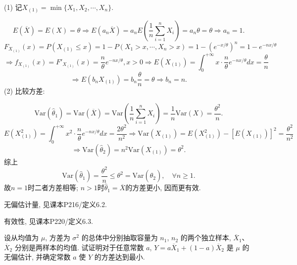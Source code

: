 \documentclass[standard]{ExBook}
\renewenvironment{shaded}{%
  \def\FrameCommand{\fboxsep=\FrameSep \colorbox{shadecolor}}%
  \MakeFramed{\advance\hsize-\width \FrameRestore}%
}{%
  \endMakeFramed
}
\begin{document}
\begin{qitems}
(1) 记$X_{(1)}=\min\{X_1,X_2,\cdots,X_n\}$.

$$
E(\overline{X})=E(X)=\theta
\Longrightarrow
E(a_n\overline{X})=a_n E\left(\frac{1}{n}\sum\limits_{i=1}^{n}X_i\right)=a_n\theta=\theta
\Longrightarrow
a_n=1.
$$
$$
F_{X_{(1)}}(x)=P(X_{(1)}\leq x)=1-P(X_1>x,\cdots,X_n>x)
=1-\left(e^{-x/\theta}\right)^n
=1-e^{-nx/\theta}
$$
$$
\Longrightarrow
f_{X_{(1)}}(x)=F'_{X_{(1)}}(x)=\frac{n}{\theta}e^{-nx/\theta}, x>0
\Longrightarrow
E(X_{(1)})=\int_{0}^{+\infty}x\cdot\frac{n}{\theta}e^{-nx/\theta}dx=\frac{\theta}{n}
$$
$$
\Longrightarrow
E(b_nX_{(1)})=b_n\frac{\theta}{n}=\theta
\Longrightarrow
b_n=n.
$$
(2) 比较方差:

$$
\mathrm{Var}(\hat{\theta}_1)
=\mathrm{Var}(\overline{X})
=\mathrm{Var}\left(\frac{1}{n}\sum\limits_{i=1}^{n}X_i\right)
=\frac{1}{n}\mathrm{Var}(X)
=\frac{\theta^2}{n}.
$$
$$
E(X_{(1)}^2)=\int_{0}^{+\infty}x^2\cdot\frac{n}{\theta}e^{-nx/\theta}dx
=\frac{2\theta^2}{n^2}
\Longrightarrow
\mathrm{Var}(X_{(1)})=E(X_{(1)}^2)-[E(X_{(1)})]^2
=\frac{\theta^2}{n^2}
$$
$$
\Longrightarrow
\mathrm{Var}(\hat{\theta}_2)
=n^2\mathrm{Var}(X_{(1)})
=\theta^2.
$$
综上
$$
\mathrm{Var}(\hat{\theta}_1)=\frac{\theta^2}{n}
\leq
\theta^2=\mathrm{Var}(\hat{\theta}_2),
\quad \forall n\geq1.
$$
故$n=1$时二者方差相等; $n>1$时$\hat{\theta}_1=\overline{X}$的方差更小, 因而更有效.

\textcolor{themeColor}{\selectfont {} 无偏估计量, 见课本P216/定义6.2.}

\textcolor{themeColor}{\selectfont {} 有效性, 见课本P220/定义6.3.}

\vspace{2.5cm-5em}

    \begin{bbox}
    \begin{shaded}
        \qitem
设从均值为 \(\mu\), 方差为 \(\sigma^2\) 的总体中分别抽取容量为 \(n_1\), \(n_2\) 的两个独立样本, \(\overline{X}_1\)、\(\overline{X}_2\) 分别是两样本的均值. 试证明对于任意常数 \(a\), \(Y = a\overline{X}_1 + (1 - a)\overline{X}_2\) 是 \(\mu\) 的无偏估计, 并确定常数 \(a\) 使 \(Y\) 的方差达到最小.
    \end{shaded}
    \end{bbox}

\vspace{\dimexpr2.5cm-5em\relax}


\end{qitems}
\end{document}
